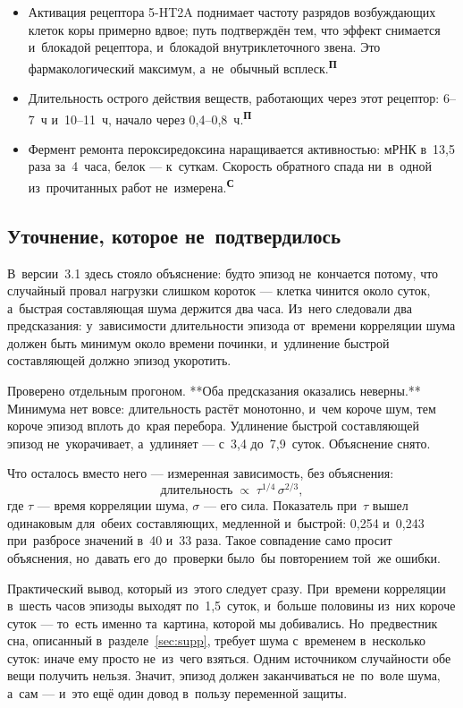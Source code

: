 \documentclass[11pt,a4paper,landscape,twocolumn]{article}
\newcommand{\tS}{\textsuperscript{\sffamily\bfseries\color{cB}С}}
\newcommand{\tP}{\textsuperscript{\sffamily\bfseries\color{cA}П}}
\newcommand{\facts}{\par\vspace{3pt}{\sffamily\bfseries\small\color{cM}Опорные факты}\par\vspace{-2pt}}
\begin{document}
\facts
\begin{itemize}
\item Активация рецептора 5-HT2A поднимает частоту разрядов возбуждающих клеток коры примерно вдвое; путь подтверждён тем, что эффект снимается и~блокадой рецептора, и~блокадой внутриклеточного звена. Это фармакологический максимум, а~не~обычный всплеск.\tP
\item Длительность острого действия веществ, работающих через этот рецептор: 6–7~ч и~10–11~ч, начало через 0,4–0,8~ч.\tP
\item Фермент ремонта пероксиредоксина наращивается активностью: мРНК в~13,5 раза за~4~часа, белок — к~суткам. Скорость обратного спада ни~в~одной из~прочитанных работ не~измерена.\tS
\end{itemize}

\subsection{Уточнение, которое не~подтвердилось}
В~версии~3.1 здесь стояло объяснение: будто эпизод не~кончается потому, что случайный провал нагрузки слишком короток — клетка чинится около суток, а~быстрая составляющая шума держится два часа. Из~него следовали два предсказания: у~зависимости длительности эпизода от~времени корреляции шума должен быть минимум около времени починки, и~удлинение быстрой составляющей должно эпизод укоротить.

Проверено отдельным прогоном. **Оба предсказания оказались неверны.** Минимума нет вовсе: длительность растёт монотонно, и~чем короче шум, тем короче эпизод вплоть до~края перебора. Удлинение быстрой составляющей эпизод не~укорачивает, а~удлиняет — с~3,4 до~7,9~суток. Объяснение снято.

Что осталось вместо него — измеренная зависимость, без объяснения:
\[\text{длительность} \;\propto\; \tau^{1/4}\,\sigma^{2/3},\]
где $\tau$ — время корреляции шума, $\sigma$ — его сила. Показатель при~$\tau$ вышел одинаковым для~обеих составляющих, медленной и~быстрой: 0,254 и~0,243 при~разбросе значений в~40 и~33 раза. Такое совпадение само просит объяснения, но~давать его до~проверки было~бы повторением той~же ошибки.

Практический вывод, который из~этого следует сразу. При~времени корреляции в~шесть часов эпизоды выходят по~1,5~суток, и~больше половины из~них короче суток — то~есть именно та~картина, которой мы добивались. Но~предвестник сна, описанный в~разделе~\ref{sec:supp}, требует шума с~временем в~несколько суток: иначе ему просто не~из~чего взяться. Одним источником случайности обе вещи получить нельзя. Значит, эпизод должен заканчиваться не~по~воле шума, а~сам — и~это ещё один довод в~пользу переменной защиты.
\end{document}

